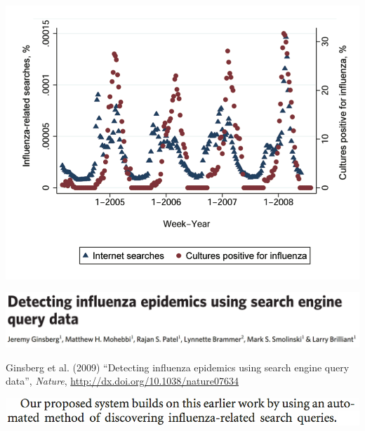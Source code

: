 \documentclass[aspectratio=169]{beamer}
\def\vf{\vfill}
\begin{document}
\begin{frame}

\begin{center}
\includegraphics[width=\textwidth]{figures/polgreen_using_2008_fig1}
\end{center}

\end{frame}
\begin{frame}

\begin{center}
\includegraphics[width=\textwidth]{figures/ginsberg_detecting_2009_title}
\end{center}

\vf
Ginsberg et al. (2009) ``Detecting influenza epidemics using search engine query data'', \textit{Nature}, \url{http://dx.doi.org/10.1038/nature07634}

\end{frame}
\begin{frame}

\begin{center}
\includegraphics[width=\textwidth]{figures/ginsberg_detecting_2009_data}
\end{center}

\end{frame}
\end{document}

